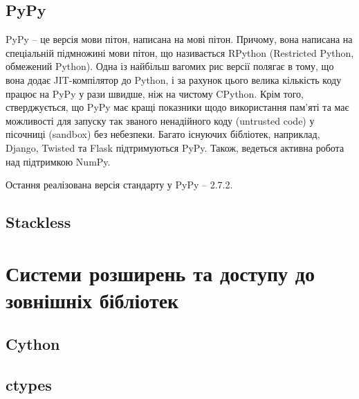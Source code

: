 \documentclass[a4paper, 12pt]{article}
\begin{document}
\subsection{PyPy}
PyPy -- це версія мови пітон, написана на мові пітон. Причому, вона написана на спеціальній 
підмножині мови пітон, що називається RPython (Restricted Python, обмежений Python). Одна 
із найбільш вагомих рис версії полягає в тому, що вона додає JIT-компілятор до Python, і за 
рахунок цього велика кількість коду працює на PyPy у рази швидше, ніж на чистому CPython. 
Крім того, стверджується, що PyPy має кращі показники щодо використання пам'яті та має 
можливості для запуску так званого ненадійного коду (untrusted code) у пісочниці (sandbox) 
без небезпеки. Багато існуючих бібліотек, наприклад, Django, Twisted та Flask підтримуються 
PyPy. Також, ведеться активна робота над підтримкою NumPy.

Остання реалізована версія стандарту у PyPy -- 2.7.2.

\subsection{Stackless}

\section{Системи розширень та доступу до зовнішніх бібліотек}

\subsection{Cython}

\subsection{ctypes}
\end{document}
